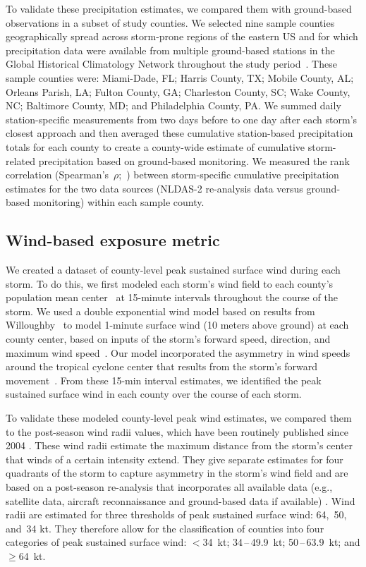 To validate these precipitation estimates, we compared them with ground-based
observations in a subset of study counties. We selected nine sample counties
geographically spread across storm-prone regions of the eastern \ac{US} and for
which precipitation data were available from multiple ground-based stations
in the Global Historical Climatology Network throughout the study
period~\parencite{menne2012overview, rnoaa, countyweather}. These sample
counties were: Miami-Dade, FL; Harris County, TX; Mobile County, AL; Orleans
Parish, LA; Fulton County, GA; Charleston County, SC; Wake County, NC;
Baltimore County, MD; and Philadelphia County, PA. We summed daily
station-specific measurements from two days before to one day after each
storm's closest approach and then averaged these cumulative station-based
precipitation totals for each county to create a county-wide estimate of
cumulative storm-related precipitation based on ground-based monitoring. We
measured the rank correlation (Spearman's~$\rho$;~\textcite{spearman1904proof})
between storm-specific cumulative precipitation estimates for the two data
sources (\ac{NLDAS-2} re-analysis data versus ground-based monitoring) within
each sample county.

\subsection*{Wind-based exposure metric}

We created a dataset of county-level peak sustained surface wind during each
storm. To do this, we first modeled each storm's wind field to each county's
population mean center~\parencite{countycenters} at 15-minute intervals
throughout the course of the storm. We used a double exponential wind model
based on results from Willoughby~\parencite{willoughby2006parametric} to model
1-minute surface wind (10 meters above ground) at each county center, based on
inputs of the storm's forward speed, direction, and maximum wind
speed~\parencite{stormwindmodel}. Our model incorporated the asymmetry in wind
speeds around the tropical cyclone center that results from the storm's forward
movement~\parencite{phadke2003modeling}.  From these 15-\si{\minute} interval
estimates, we identified the peak sustained surface wind in each county over
the course of each storm.

To validate these modeled county-level peak wind estimates, we compared them
to the  post-season wind radii values, which have been routinely published
since 2004 \parencite{knaff2016using}. These wind radii estimate the maximum
distance from the storm's center that winds of a certain intensity extend. They
give separate estimates for four quadrants of the storm to capture asymmetry in
the storm's wind field and are based on a post-season re-analysis that
incorporates all available data (e.g., satellite data, aircraft reconnaissance and
ground-based data if available) \parencite{knaff2016using}. Wind radii are
estimated for three thresholds of peak sustained surface wind: 64,~50, and~34
kt.  They therefore allow for the classification of counties into four
categories of peak sustained surface wind: $<$34~kt; 34\,--\,49.9~kt;
50\,--\,63.9~kt; and $\ge$64~kt. 

